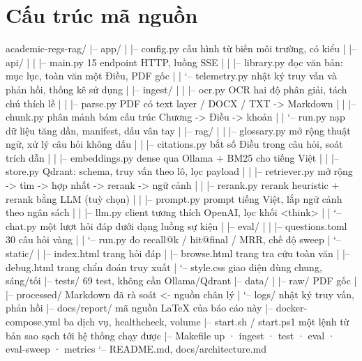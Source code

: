 \appendix
\renewcommand{\thesection}{Phụ lục~\Alph{section}}
\setcounter{section}{0}

\section{Cấu trúc mã nguồn}

\begin{codeblock}
academic-regs-rag/
|-- app/
|   |-- config.py              cấu hình từ biến môi trường, có kiểu
|   |-- api/
|   |   |-- main.py            15 endpoint HTTP, luồng SSE
|   |   |-- library.py         đọc văn bản: mục lục, toàn văn một Điều, PDF gốc
|   |   `-- telemetry.py       nhật ký truy vấn và phản hồi, thống kê sử dụng
|   |-- ingest/
|   |   |-- ocr.py             OCR hai độ phân giải, tách chú thích lề
|   |   |-- parse.py           PDF có text layer / DOCX / TXT -> Markdown
|   |   |-- chunk.py           phân mảnh bám cấu trúc Chương -> Điều -> khoản
|   |   `-- run.py             nạp dữ liệu tăng dần, manifest, dấu vân tay
|   |-- rag/
|   |   |-- glossary.py        mở rộng thuật ngữ, xử lý câu hỏi không dấu
|   |   |-- citations.py       bắt số Điều trong câu hỏi, soát trích dẫn
|   |   |-- embeddings.py      dense qua Ollama + BM25 cho tiếng Việt
|   |   |-- store.py           Qdrant: schema, truy vấn theo lô, lọc payload
|   |   |-- retriever.py       mở rộng -> tìm -> hợp nhất -> rerank -> ngữ cảnh
|   |   |-- rerank.py          rerank heuristic + rerank bằng LLM (tuỳ chọn)
|   |   |-- prompt.py          prompt tiếng Việt, lắp ngữ cảnh theo ngân sách
|   |   |-- llm.py             client tương thích OpenAI, lọc khối <think>
|   |   `-- chat.py            một lượt hỏi đáp dưới dạng luồng sự kiện
|   |-- eval/
|   |   |-- questions.toml     30 câu hỏi vàng
|   |   `-- run.py             đo recall@k / hit@final / MRR, chế độ sweep
|   `-- static/
|       |-- index.html         trang hỏi đáp
|       |-- browse.html        trang tra cứu toàn văn
|       |-- debug.html         trang chẩn đoán truy xuất
|       `-- style.css          giao diện dùng chung, sáng/tối
|-- tests/                     69 test, không cần Ollama/Qdrant
|-- data/
|   |-- raw/                   PDF gốc
|   |-- processed/             Markdown đã rà soát  <- nguồn chân lý
|   `-- logs/                  nhật ký truy vấn, phản hồi
|-- docs/report/               mã nguồn LaTeX của báo cáo này
|-- docker-compose.yml         ba dịch vụ, healthcheck, volume
|-- start.sh / start.ps1       một lệnh từ bản sao sạch tới hệ thống chạy được
|-- Makefile                   up · ingest · test · eval · eval-sweep · metrics
`-- README.md, docs/architecture.md
\end{codeblock}

